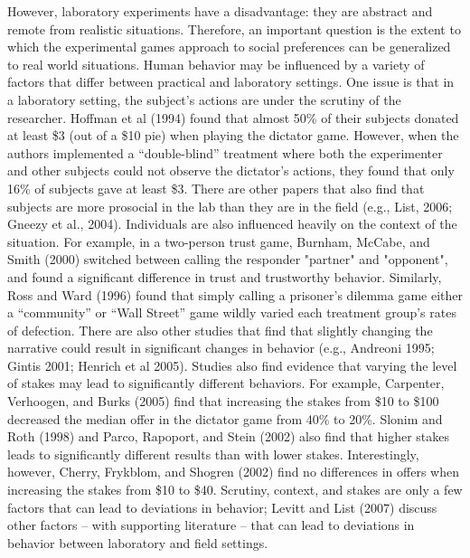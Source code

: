 \documentclass[12pt]{article}
\begin{document}
However, laboratory experiments have a disadvantage: they are abstract and remote from realistic situations. Therefore, an important question is the extent to which the experimental games approach to social preferences can be generalized to real world situations. Human behavior may be influenced by a variety of factors that differ between practical and laboratory settings. One issue is that in a laboratory setting, the subject's actions are under the scrutiny of the researcher. Hoffman et al (1994) found that almost 50\% of their subjects donated at least \$3 (out of a \$10 pie) when playing the dictator game. However, when the authors implemented a ``double-blind'' treatment where both the experimenter and other subjects could not observe the dictator\rq s actions, they found that only 16\% of subjects gave at least \$3. There are other papers that also find that subjects are more prosocial in the lab than they are in the field (e.g., List, 2006; Gneezy et al., 2004). Individuals are also influenced heavily on the context of the situation. For example, in a two-person trust game, Burnham, McCabe, and Smith (2000) switched between calling the responder "partner" and "opponent", and found a significant difference in trust and trustworthy behavior. Similarly, Ross and Ward (1996) found that simply calling a prisoner's dilemma game either a ``community'' or ``Wall Street'' game wildly varied each treatment group\rq s rates of defection. There are also other studies that find that slightly changing the narrative could result in significant changes in behavior (e.g., Andreoni 1995; Gintis 2001;  Henrich et al 2005). Studies also find evidence that varying the level of stakes may lead to significantly different behaviors. For example, Carpenter, Verhoogen, and Burks (2005) find that increasing the stakes from \$10 to \$100 decreased the median offer in the dictator game from 40\% to 20\%. Slonim and Roth (1998) and Parco, Rapoport, and Stein (2002) also find that higher stakes leads to significantly different results than with lower stakes. Interestingly, however, Cherry, Frykblom, and Shogren (2002) find no differences in offers when increasing the stakes from \$10 to \$40. Scrutiny, context, and stakes are only a few factors that can lead to deviations in behavior; Levitt and List (2007) discuss other factors -- with supporting literature -- that can lead to deviations in behavior between laboratory and field settings. 
 
\end{document}
